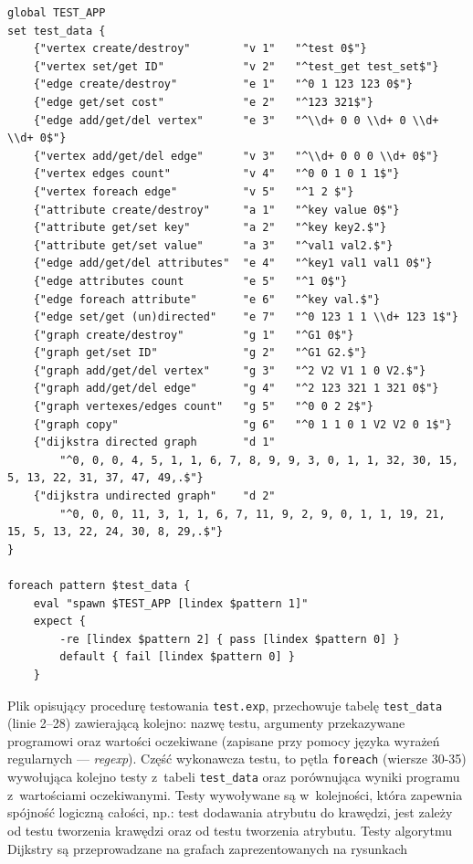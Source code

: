 \documentclass[a4paper,12pt,polish,oneside]{thesis}
\newcommand\code[1]{\lstinline[style=line]{#1}}
\begin{document}
\begin{lstlisting}[style=code,caption=Plik definicji testów jednostkowych platformy DejaGNU]
global TEST_APP
set test_data {
	{"vertex create/destroy"        "v 1"   "^test 0$"}
	{"vertex set/get ID"            "v 2"   "^test_get test_set$"}
	{"edge create/destroy"          "e 1"   "^0 1 123 123 0$"}
	{"edge get/set cost"            "e 2"   "^123 321$"}
	{"edge add/get/del vertex"      "e 3"   "^\\d+ 0 0 \\d+ 0 \\d+ \\d+ 0$"}
	{"vertex add/get/del edge"      "v 3"   "^\\d+ 0 0 0 \\d+ 0$"}
	{"vertex edges count"           "v 4"   "^0 0 1 0 1 1$"}
	{"vertex foreach edge"          "v 5"   "^1 2 $"}
	{"attribute create/destroy"     "a 1"   "^key value 0$"}
	{"attribute get/set key"        "a 2"   "^key key2.$"}
	{"attribute get/set value"      "a 3"   "^val1 val2.$"}
	{"edge add/get/del attributes"  "e 4"   "^key1 val1 val1 0$"}
	{"edge attributes count         "e 5"   "^1 0$"}
	{"edge foreach attribute"       "e 6"   "^key val.$"}
	{"edge set/get (un)directed"    "e 7"   "^0 123 1 1 \\d+ 123 1$"}
	{"graph create/destroy"         "g 1"   "^G1 0$"}
	{"graph get/set ID"             "g 2"   "^G1 G2.$"}
	{"graph add/get/del vertex"     "g 3"   "^2 V2 V1 1 0 V2.$"}
	{"graph add/get/del edge"       "g 4"   "^2 123 321 1 321 0$"}
	{"graph vertexes/edges count"   "g 5"   "^0 0 2 2$"}
	{"graph copy"                   "g 6"   "^0 1 1 0 1 V2 V2 0 1$"}
	{"dijkstra directed graph       "d 1"
		"^0, 0, 0, 4, 5, 1, 1, 6, 7, 8, 9, 9, 3, 0, 1, 1, 32, 30, 15, 5, 13, 22, 31, 37, 47, 49,.$"}
	{"dijkstra undirected graph"    "d 2"
		"^0, 0, 0, 11, 3, 1, 1, 6, 7, 11, 9, 2, 9, 0, 1, 1, 19, 21, 15, 5, 13, 22, 24, 30, 8, 29,.$"}
}

foreach pattern $test_data {
	eval "spawn $TEST_APP [lindex $pattern 1]"
	expect {
		-re [lindex $pattern 2] { pass [lindex $pattern 0] }
		default { fail [lindex $pattern 0] }
	}
\end{lstlisting}
Plik opisujący procedurę testowania \code{test.exp}, przechowuje tabelę \code{test_data} (linie 2--28) zawierającą kolejno: nazwę testu, argumenty przekazywane programowi oraz wartości oczekiwane (zapisane przy pomocy języka wyrażeń regularnych --- \emph{regexp}).
Część wykonawcza testu, to pętla \code{foreach} (wiersze 30-35) wywołująca kolejno testy z~tabeli \code{test_data} oraz porównująca wyniki programu z~wartościami oczekiwanymi.
Testy wywoływane są w~kolejności, która zapewnia spójność logiczną całości, np.: test dodawania atrybutu do krawędzi, jest zależy od testu tworzenia krawędzi oraz od testu tworzenia atrybutu.
Testy algorytmu Dijkstry są przeprowadzane na grafach zaprezentowanych na rysunkach %
\end{document}
